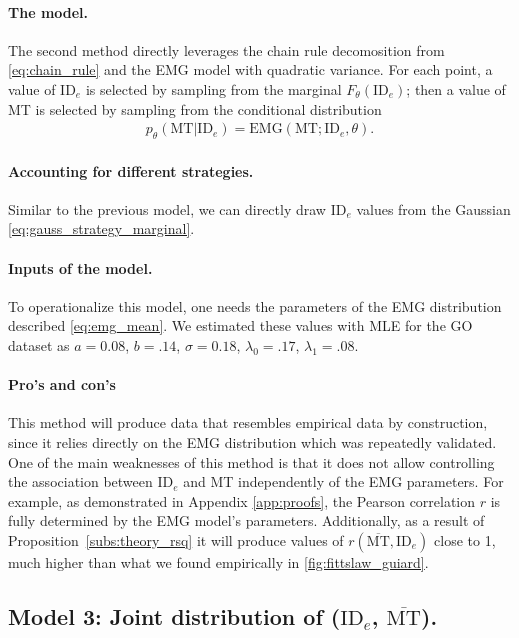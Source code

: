 \documentclass[acmlarge, manuscript,review]{acmart}
\newcommand{\mmt}{\ensuremath{\overline{\mt}}\xspace}
\newcommand{\mt}{\ensuremath{{\text{MT}}}\xspace}
\newcommand{\ide}{\ensuremath{{\text{ID}_e}}\xspace}
\begin{document}
\paragraph{The model.} The second method directly leverages the chain rule decomosition from \autoref{eq:chain_rule} and the EMG model with quadratic variance. For each point, a value of $\ide$ is selected by sampling from the marginal $F_{\theta}(\ide)$; then a value of MT is selected by sampling from the conditional distribution
\begin{align}
  p_{\theta}(\mt|\ide) = \text{EMG}(\mt; \ide, \theta).
\end{align}

\paragraph{Accounting for different strategies.} Similar to the previous model, we can directly draw \ide values from the Gaussian \autoref{eq:gauss_strategy_marginal}.%

\paragraph{Inputs of the model.} To operationalize this model, one needs the parameters of the EMG distribution described \autoref{eq:emg_mean}. We estimated these values with MLE for the GO dataset as $a = 0.08$, $b = .14$, $\sigma=0.18$, $\lambda_0 = .17$, $\lambda_1 = .08$.

\paragraph{Pro's and con's} This method will produce data that resembles empirical data by construction, since it relies directly on the EMG distribution which was repeatedly validated. One of the main weaknesses of this method is that it does not allow controlling the association between \ide and MT independently of the EMG parameters. For example, as demonstrated in Appendix \ref{app:proofs}, the Pearson correlation $r$ is fully determined by the EMG model's parameters. Additionally, as a result of Proposition~\ref{subs:theory_rsq} it will produce values of $r(\mmt, \ide)$ close to 1, much higher than what we found empirically in \autoref{fig:fittslaw_guiard}.

\subsection{Model 3: Joint distribution of (\ide, \mmt).}
\end{document}
